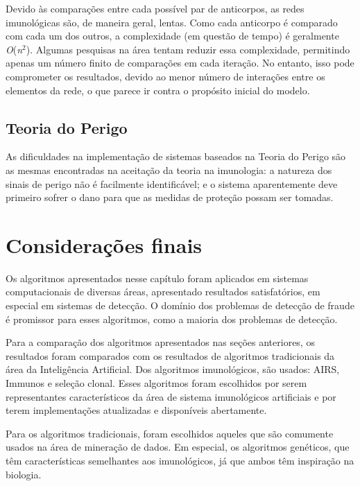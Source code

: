 Devido às comparações entre cada possível par de anticorpos, as redes imunológicas são, de maneira geral, lentas. Como cada anticorpo é comparado com cada um dos outros, a complexidade (em questão de tempo) é geralmente \emph{O}(\emph{n$^{2}$}). Algumas pesquisas na área tentam reduzir essa complexidade, permitindo apenas um número finito de comparações em cada iteração. No entanto, isso pode comprometer os resultados, devido ao menor número de interações entre os elementos da rede, o que parece ir contra o propósito inicial do modelo.

\subsection{Teoria do Perigo}

As dificuldades na implementação de sistemas baseados na Teoria do Perigo são as mesmas encontradas na aceitação da teoria na imunologia: a natureza dos sinais de perigo não é facilmente identificável; e o sistema aparentemente deve primeiro sofrer o dano para que as medidas de proteção possam ser tomadas.

\section{Considerações finais}

Os algoritmos apresentados nesse capítulo foram aplicados em sistemas computacionais de diversas áreas, apresentado resultados satisfatórios, em especial em sistemas de detecção. O domínio dos problemas de detecção de fraude é promissor para esses algoritmos, como a maioria dos problemas de detecção.

Para a comparação dos algoritmos apresentados nas seções anteriores, os resultados foram comparados com os resultados de algoritmos tradicionais da área da Inteligência Artificial. Dos algoritmos imunológicos, são usados: AIRS, Immunos e seleção clonal. Esses algoritmos foram escolhidos por serem representantes característicos da área de sistema imunológicos artificiais e por terem implementações atualizadas e disponíveis abertamente.

Para os algoritmos tradicionais, foram escolhidos aqueles que são comumente usados na área de mineração de dados. Em especial, os algoritmos genéticos, que têm características semelhantes aos imunológicos, já que ambos têm inspiração na biologia.

